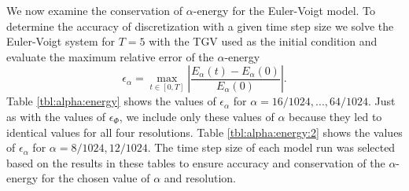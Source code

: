 \noindent We now examine the conservation of $\alpha$-energy for the Euler-Voigt model. To determine the accuracy of discretization with a given time step size we solve the Euler-Voigt system for $T=5$ with the TGV used as the initial condition and evaluate the maximum relative error of the $\alpha$-energy
\begin{equation}\label{eq:alpha:energy:rel}
\epsilon_{\alpha} = \max_{t\in[0,T]}\left|\frac{E_\alpha(t) - E_\alpha(0)}{E_\alpha(0)}\right|.
\end{equation}
Table \ref{tbl:alpha:energy} shows the values of $\epsilon_{\alpha}$ for $\alpha=16/1024,...,64/1024$. Just as with the values of $\epsilon_{\Phi}$, we include only these values of $\alpha$ because they led to identical values for all four resolutions. Table \ref{tbl:alpha:energy:2} shows the values of $\epsilon_{\alpha}$ for $\alpha=8/1024,12/1024$. The time step size of each model run was selected based on the results in these tables to ensure accuracy and conservation of the $\alpha$-energy for the chosen value of $\alpha$ and resolution.

